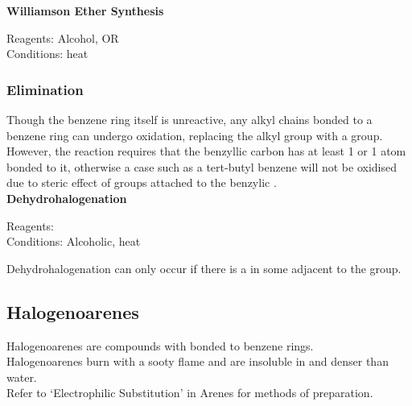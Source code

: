 \documentclass[../main]{subfiles}
\begin{document}
	\noindent \textbf{Williamson Ether Synthesis}

	Reagents: Alcohol,  OR \\
	Conditions: heat \\

	\subsubsection{Elimination}

	Though the benzene ring itself is unreactive, any alkyl chains bonded to a benzene ring can undergo oxidation, replacing the alkyl group with a  group. However, the reaction requires that the benzyllic carbon has at least 1  or 1  atom bonded to it, otherwise a case such as a tert-butyl benzene will not be oxidised due to steric effect of  groups attached to the benzylic . \\

	\noindent \textbf{Dehydrohalogenation}

	Reagents:  \\
	Conditions: Alcoholic, heat \\


	Dehydrohalogenation can only occur if there is a  in some  adjacent to the  group. \\

	\subsection{Halogenoarenes}

	Halogenoarenes are compounds with  bonded to benzene rings. \\

	Halogenoarenes burn with a sooty flame and are insoluble in and denser than water. \\

	Refer to `Electrophilic Substitution' in Arenes for methods of preparation. \\
\end{document}
